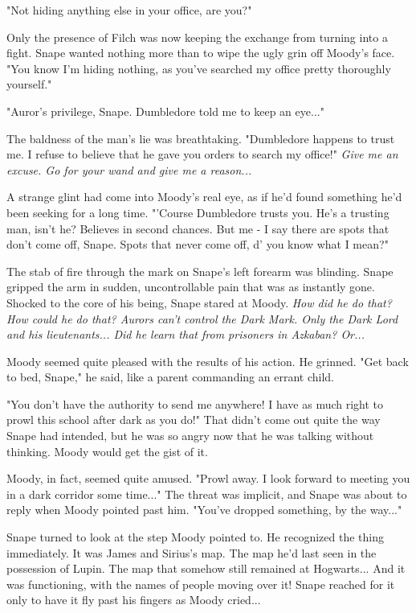 \documentclass[a4paper,11pt]{article}
\begin{document}
"Not hiding anything else in your office, are you?"

Only the presence of Filch was now keeping the exchange from turning into a fight. Snape wanted nothing more than to wipe the ugly grin off Moody's face. "You know I'm hiding nothing, as you've searched my office pretty thoroughly yourself."

"Auror's privilege, Snape. Dumbledore told me to keep an eye..."

The baldness of the man's lie was breathtaking. "Dumbledore happens to trust me. I refuse to believe that he gave you orders to search my office!" \emph{Give me an excuse. Go for your wand and give me a reason...}

A strange glint had come into Moody's real eye, as if he'd found something he'd been seeking for a long time. "'Course Dumbledore trusts you. He's a trusting man, isn't he? Believes in second chances. But me - I say there are spots that don't come off, Snape. Spots that never come off, d' you know what I mean?"

The stab of fire through the mark on Snape's left forearm was blinding. Snape gripped the arm in sudden, uncontrollable pain that was as instantly gone. Shocked to the core of his being, Snape stared at Moody. \emph{How did he do that? How could he do that? Aurors can't control the Dark Mark. Only the Dark Lord and his lieutenants... Did he learn that from prisoners in Azkaban? Or...}

Moody seemed quite pleased with the results of his action. He grinned. "Get back to bed, Snape," he said, like a parent commanding an errant child.

"You don't have the authority to send me anywhere! I have as much right to prowl this school after dark as you do!" That didn't come out quite the way Snape had intended, but he was so angry now that he was talking without thinking. Moody would get the gist of it.

Moody, in fact, seemed quite amused. "Prowl away. I look forward to meeting you in a dark corridor some time..." The threat was implicit, and Snape was about to reply when Moody pointed past him. "You've dropped something, by the way..."

Snape turned to look at the step Moody pointed to. He recognized the thing immediately. It was James and Sirius's map. The map he'd last seen in the possession of Lupin. The map that somehow still remained at Hogwarts... And it was functioning, with the names of people moving over it! Snape reached for it only to have it fly past his fingers as Moody cried...
\end{document}

